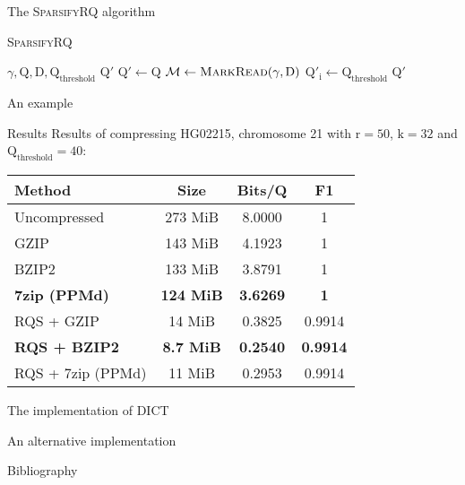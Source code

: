 \documentclass[12pt]{beamer}
\begin{document}
    \begin{frame}{The \textsc{SparsifyRQ} algorithm}
        \begin{algorithm}[H]
            \caption{\textsc{SparsifyRQ}}
            \begin{algorithmic}[1]
                \REQUIRE \(\gamma,\text{Q},\text{D},\text{Q}_{\text{threshold}}\)
                \ENSURE \(\text{Q}'\)
                \STATE \(\text{Q}' \leftarrow \text{Q}\)
                \STATE \(\mathcal{M} \leftarrow \text{\textsc{MarkRead}}(\gamma, \text{D})\)
                        \STATE \(\text{Q}'_\text{i} \leftarrow \text{Q}_{\text{threshold}}\)
                    \ENDIF
                \ENDFOR
                \RETURN \(\text{Q}'\)
            \end{algorithmic}
        \end{algorithm}
    \end{frame}

    \begin{frame}{An example}
    \end{frame}

    \begin{frame}{Results}
        Results of compressing HG02215, chromosome 21 with \(\text{r} = 50\),
        \(\text{k} = 32\) and \(\text{Q}_\text{threshold} = 40\):

        \vspace{0.25cm}

        \begin{table}
            \centering
            \begin{tabularx}{\linewidth}{Xccc}
                \hline
                Method & Size & Bits/Q & F1 \\
                \hline
                Uncompressed & 273 MiB & 8.0000 & 1 \\
                GZIP & 143 MiB & 4.1923 & 1 \\
                BZIP2 & 133 MiB & 3.8791 & 1 \\
                \textbf{7zip (PPMd)} & \textbf{124 MiB} & \textbf{3.6269} & \textbf{1} \\
                \hline
                RQS + GZIP & 14 MiB & 0.3825 & 0.9914 \\
                \textbf{RQS + BZIP2} & \textbf{8.7 MiB} & \textbf{0.2540} & \textbf{0.9914} \\
                RQS + 7zip (PPMd) & 11 MiB & 0.2953 & 0.9914\\
                \hline
            \end{tabularx}
        \end{table}
    \end{frame}

    \begin{frame}{The implementation of \textsc{DICT}}
    \end{frame}

    \begin{frame}{An alternative implementation}
    \end{frame}

    \begin{frame}[allowframebreaks]{Bibliography}
        
    \end{frame}
\end{document}
